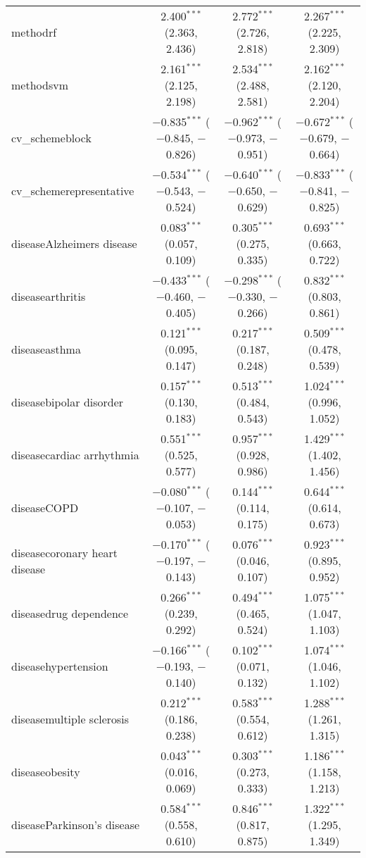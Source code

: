 \begin{table}[!htbp]
\begin{tabular}{@{\extracolsep{5pt}}lccc}
  methodrf & 2.400$^{***}$ (2.363, 2.436) & 2.772$^{***}$ (2.726, 2.818) & 2.267$^{***}$ (2.225, 2.309) \\ 
  methodsvm & 2.161$^{***}$ (2.125, 2.198) & 2.534$^{***}$ (2.488, 2.581) & 2.162$^{***}$ (2.120, 2.204) \\ 
  cv\_schemeblock & $-$0.835$^{***}$ ($-$0.845, $-$0.826) & $-$0.962$^{***}$ ($-$0.973, $-$0.951) & $-$0.672$^{***}$ ($-$0.679, $-$0.664) \\ 
  cv\_schemerepresentative & $-$0.534$^{***}$ ($-$0.543, $-$0.524) & $-$0.640$^{***}$ ($-$0.650, $-$0.629) & $-$0.833$^{***}$ ($-$0.841, $-$0.825) \\ 
  diseaseAlzheimers disease & 0.083$^{***}$ (0.057, 0.109) & 0.305$^{***}$ (0.275, 0.335) & 0.693$^{***}$ (0.663, 0.722) \\ 
  diseasearthritis & $-$0.433$^{***}$ ($-$0.460, $-$0.405) & $-$0.298$^{***}$ ($-$0.330, $-$0.266) & 0.832$^{***}$ (0.803, 0.861) \\ 
  diseaseasthma & 0.121$^{***}$ (0.095, 0.147) & 0.217$^{***}$ (0.187, 0.248) & 0.509$^{***}$ (0.478, 0.539) \\ 
  diseasebipolar disorder & 0.157$^{***}$ (0.130, 0.183) & 0.513$^{***}$ (0.484, 0.543) & 1.024$^{***}$ (0.996, 1.052) \\ 
  diseasecardiac arrhythmia & 0.551$^{***}$ (0.525, 0.577) & 0.957$^{***}$ (0.928, 0.986) & 1.429$^{***}$ (1.402, 1.456) \\ 
  diseaseCOPD & $-$0.080$^{***}$ ($-$0.107, $-$0.053) & 0.144$^{***}$ (0.114, 0.175) & 0.644$^{***}$ (0.614, 0.673) \\ 
  diseasecoronary heart disease & $-$0.170$^{***}$ ($-$0.197, $-$0.143) & 0.076$^{***}$ (0.046, 0.107) & 0.923$^{***}$ (0.895, 0.952) \\ 
  diseasedrug dependence & 0.266$^{***}$ (0.239, 0.292) & 0.494$^{***}$ (0.465, 0.524) & 1.075$^{***}$ (1.047, 1.103) \\ 
  diseasehypertension & $-$0.166$^{***}$ ($-$0.193, $-$0.140) & 0.102$^{***}$ (0.071, 0.132) & 1.074$^{***}$ (1.046, 1.102) \\ 
  diseasemultiple sclerosis & 0.212$^{***}$ (0.186, 0.238) & 0.583$^{***}$ (0.554, 0.612) & 1.288$^{***}$ (1.261, 1.315) \\ 
  diseaseobesity & 0.043$^{***}$ (0.016, 0.069) & 0.303$^{***}$ (0.273, 0.333) & 1.186$^{***}$ (1.158, 1.213) \\ 
  diseaseParkinson's disease & 0.584$^{***}$ (0.558, 0.610) & 0.846$^{***}$ (0.817, 0.875) & 1.322$^{***}$ (1.295, 1.349) \\ 

\end{tabular}
\end{table}
